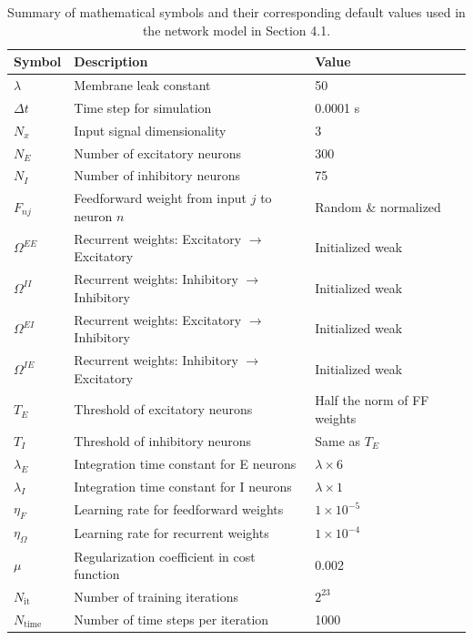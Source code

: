 \documentclass[11pt]{article}
\theoremstyle{remark}
\theoremstyle{definition}
\begin{document}
\begin{table}[H]
\centering
\caption{Summary of mathematical symbols and their corresponding default values used in the network model in Section 4.1.}
\label{tab:network-params}
\begin{tabular}{lll}
\hline
\textbf{Symbol} & \textbf{Description} & \textbf{Value} \\
\hline
$\lambda$    & Membrane leak constant & 50 \\
$\Delta t$   & Time step for simulation & 0.0001 s \\
$N_x$        & Input signal dimensionality & 3 \\
$N_E$        & Number of excitatory neurons & 300 \\
$N_I$        & Number of inhibitory neurons & 75 \\
$F_{nj}$     & Feedforward weight from input $j$ to neuron $n$ & Random \& normalized \\
$\Omega^{EE}$ & Recurrent weights: Excitatory $\rightarrow$ Excitatory & Initialized weak \\
$\Omega^{II}$ & Recurrent weights: Inhibitory $\rightarrow$ Inhibitory & Initialized weak \\
$\Omega^{EI}$ & Recurrent weights: Excitatory $\rightarrow$ Inhibitory & Initialized weak \\
$\Omega^{IE}$ & Recurrent weights: Inhibitory $\rightarrow$ Excitatory & Initialized weak \\
$T_E$        & Threshold of excitatory neurons & Half the norm of FF weights \\
$T_I$        & Threshold of inhibitory neurons & Same as $T_E$ \\
$\lambda_E$  & Integration time constant for E neurons & $\lambda \times 6$ \\
$\lambda_I$  & Integration time constant for I neurons & $\lambda \times 1$ \\
$\eta_F$     & Learning rate for feedforward weights & $1 \times 10^{-5}$ \\
$\eta_\Omega$& Learning rate for recurrent weights & $1 \times 10^{-4}$ \\
$\mu$        & Regularization coefficient in cost function & 0.002 \\
$N_{\text{it}}$ & Number of training iterations & $2^{23}$ \\
$N_{\text{time}}$ & Number of time steps per iteration & 1000 \\
\hline
\end{tabular}
\end{table}

\newpage


\end{document}

